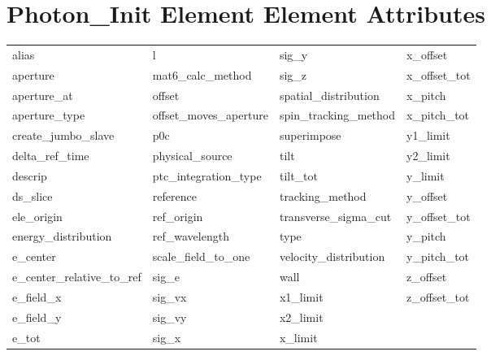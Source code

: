  \section{Photon_Init Element Element Attributes}
 \label{s:list.photon.init}
 
 \begin{tabular}{llll} \toprule
alias                       & l                           & sig_y                       & x_offset                    \\
aperture                    & mat6_calc_method            & sig_z                       & x_offset_tot                \\
aperture_at                 & offset                      & spatial_distribution        & x_pitch                     \\
aperture_type               & offset_moves_aperture       & spin_tracking_method        & x_pitch_tot                 \\
create_jumbo_slave          & p0c                         & superimpose                 & y1_limit                    \\
delta_ref_time              & physical_source             & tilt                        & y2_limit                    \\
descrip                     & ptc_integration_type        & tilt_tot                    & y_limit                     \\
ds_slice                    & reference                   & tracking_method             & y_offset                    \\
ele_origin                  & ref_origin                  & transverse_sigma_cut        & y_offset_tot                \\
energy_distribution         & ref_wavelength              & type                        & y_pitch                     \\
e_center                    & scale_field_to_one          & velocity_distribution       & y_pitch_tot                 \\
e_center_relative_to_ref    & sig_e                       & wall                        & z_offset                    \\
e_field_x                   & sig_vx                      & x1_limit                    & z_offset_tot                \\
e_field_y                   & sig_vy                      & x2_limit                    &                             \\
e_tot                       & sig_x                       & x_limit                     &                             \\
 \bottomrule
 \end{tabular}
 \vfill
 
